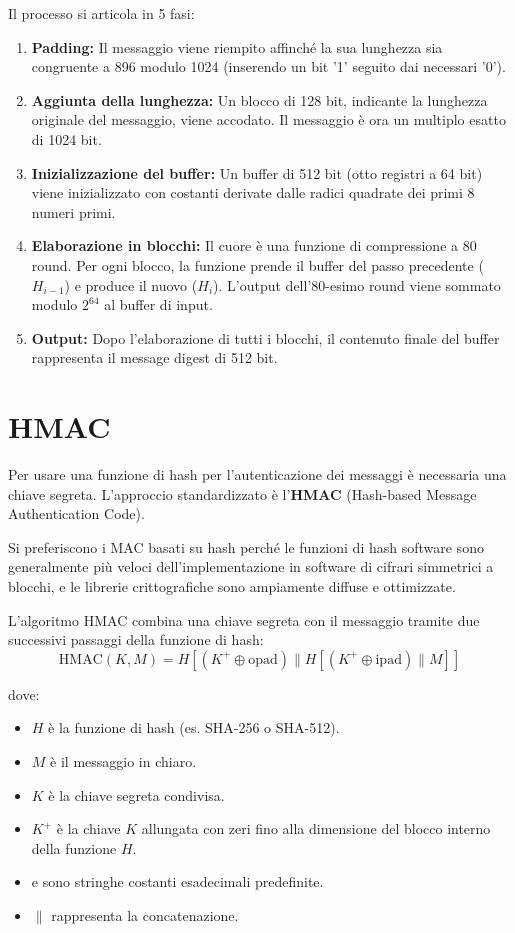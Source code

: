 Il processo si articola in 5 fasi:
\begin{enumerate}
    \item \textbf{Padding:} Il messaggio viene riempito affinché la sua lunghezza sia congruente a 896 modulo 1024 (inserendo un bit '1' seguito dai necessari '0').
    \item \textbf{Aggiunta della lunghezza:} Un blocco di 128 bit, indicante la lunghezza originale del messaggio, viene accodato. Il messaggio è ora un multiplo esatto di 1024 bit.
    \item \textbf{Inizializzazione del buffer:} Un buffer di 512 bit (otto registri a 64 bit) viene inizializzato con costanti derivate dalle radici quadrate dei primi 8 numeri primi.
    \item \textbf{Elaborazione in blocchi:} Il cuore è una funzione di compressione a 80 round. Per ogni blocco, la funzione prende il buffer del passo precedente ($H_{i-1}$) e produce il nuovo ($H_i$). L'output dell'80-esimo round viene sommato modulo $2^{64}$ al buffer di input.
    \item \textbf{Output:} Dopo l'elaborazione di tutti i blocchi, il contenuto finale del buffer rappresenta il message digest di 512 bit.
\end{enumerate}

\section{HMAC}

Per usare una funzione di hash per l'autenticazione dei messaggi è necessaria una chiave segreta. L'approccio standardizzato è l'\textbf{HMAC} (Hash-based Message Authentication Code).

\begin{notebox}
Si preferiscono i MAC basati su hash perché le funzioni di hash software sono generalmente più veloci dell'implementazione in software di cifrari simmetrici a blocchi, e le librerie crittografiche sono ampiamente diffuse e ottimizzate.
\end{notebox}

L'algoritmo HMAC combina una chiave segreta con il messaggio tramite due successivi passaggi della funzione di hash:
$$\text{HMAC}(K, M) = H[(K^+ \oplus \text{opad}) \mathbin{\|} H[(K^+ \oplus \text{ipad}) \mathbin{\|} M]]$$

dove:
\begin{itemize}
    \item $H$ è la funzione di hash (es. SHA-256 o SHA-512).
    \item $M$ è il messaggio in chiaro.
    \item $K$ è la chiave segreta condivisa.
    \item $K^+$ è la chiave $K$ allungata con zeri fino alla dimensione del blocco interno della funzione $H$.
    \item {} e  sono stringhe costanti esadecimali predefinite.
    \item $\|$ rappresenta la concatenazione.
\end{itemize}

